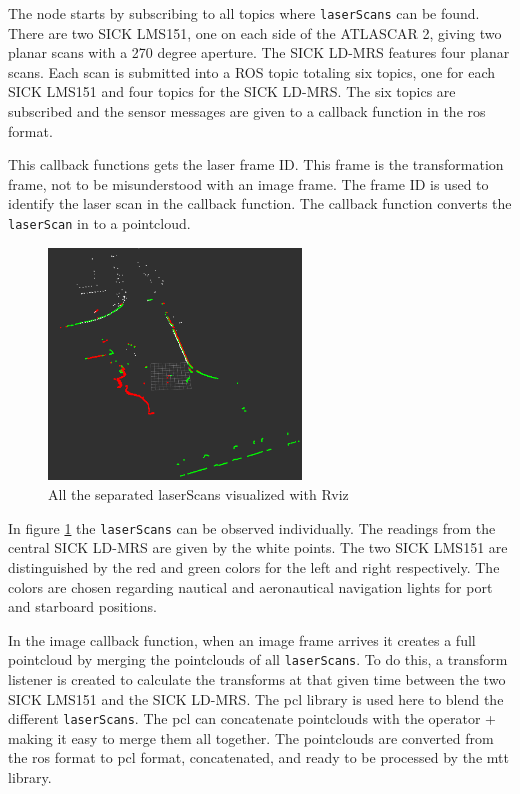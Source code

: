 The node starts by subscribing to all topics where \texttt{laserScans} can be found. There are two SICK LMS151, one on each side of the ATLASCAR 2, giving two planar scans with a 270 degree aperture. The SICK LD-MRS features four planar scans. Each scan is submitted into a ROS topic totaling six topics, one for each SICK LMS151 and four topics for the SICK LD-MRS. The six topics are subscribed and the sensor messages are given to a callback function in the \gls{ros} format.

This callback functions gets the laser frame ID. This frame is the transformation frame, not to be misunderstood with an image frame. The frame ID is used to identify the laser scan in the callback function. The callback function converts the \texttt{laserScan} in to a pointcloud.

\begin{figure}[htp]
	
	\centering
	\includegraphics[width=0.6\textwidth]{caplabel/imgs/rviz0.png}
	
	\caption{All the separated laserScans visualized with Rviz}
	\label{fig:rviz0}
	
\end{figure}

In figure \ref{fig:rviz0} the \texttt{laserScans} can be observed individually. The readings from the central SICK LD-MRS are given by the white points. The two SICK LMS151 are distinguished by the red and green colors for the left and right respectively. The colors are chosen regarding nautical and aeronautical navigation lights for port and starboard positions.

In the image callback function, when an image frame arrives it creates a full pointcloud by merging the pointclouds of all \texttt{laserScans}. To do this, a transform listener is created to calculate the transforms at that given time between the two SICK LMS151 and the SICK LD-MRS. The \gls{pcl} library is used here to blend the different \texttt{laserScans}. The \gls{pcl} can concatenate pointclouds with the operator + making it easy to merge them all together. The pointclouds are converted from the \gls{ros} format to \gls{pcl} format, concatenated, and ready to be processed by the \gls{mtt} library. 

